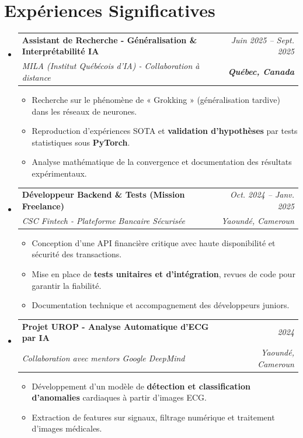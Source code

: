 \documentclass[a4paper,11pt]{article}
\makeatletter
\newcommand{\resumeSubheading}[4]{
  \vspace{-1pt}\item
    \begin{tabular*}{0.97\textwidth}[t]{l@{\extracolsep{\fill}}r}
      \textbf{#1} & \textit{\small #2} \\
      \textit{\small #3} & \textit{\small #4} \\
    \end{tabular*}\vspace{-5pt}
}
\makeatother
\begin{document}
\section{Expériences Significatives}
\begin{itemize}[leftmargin=*, label={}]

    \resumeSubheading
      {Assistant de Recherche - Généralisation \& Interprétabilité IA}{Juin 2025 -- Sept. 2025}
      {MILA (Institut Québécois d'IA) - Collaboration à distance}{\textbf{Québec, Canada}}
      \begin{itemize}[leftmargin=0.4cm, nosep, label=\tiny$\bullet$]
        \item \small{Recherche sur le phénomène de « Grokking » (généralisation tardive) dans les réseaux de neurones.}
        \item \small{Reproduction d'expériences SOTA et \textbf{validation d'hypothèses} par tests statistiques sous \textbf{PyTorch}.}
        \item \small{Analyse mathématique de la convergence et documentation des résultats expérimentaux.}
      \end{itemize}
    \vspace{2pt}

    \resumeSubheading
      {Développeur Backend \& Tests (Mission Freelance)}{Oct. 2024 -- Janv. 2025}
      {CSC Fintech - Plateforme Bancaire Sécurisée}{Yaoundé, Cameroun}
      \begin{itemize}[leftmargin=0.4cm, nosep, label=\tiny$\bullet$]
        \item \small{Conception d'une API financière critique avec haute disponibilité et sécurité des transactions.}
        \item \small{Mise en place de \textbf{tests unitaires et d'intégration}, revues de code pour garantir la fiabilité.}
        \item \small{Documentation technique et accompagnement des développeurs juniors.}
      \end{itemize}
    \vspace{2pt}

    \resumeSubheading
      {Projet UROP - Analyse Automatique d'ECG par IA}{2024}
      {Collaboration avec mentors Google DeepMind}{Yaoundé, Cameroun}
      \begin{itemize}[leftmargin=0.4cm, nosep, label=\tiny$\bullet$]
        \item \small{Développement d'un modèle de \textbf{détection et classification d'anomalies} cardiaques à partir d'images ECG.}
        \item \small{Extraction de features sur signaux, filtrage numérique et traitement d'images médicales.}
      \end{itemize}
\end{itemize}
\end{document}
